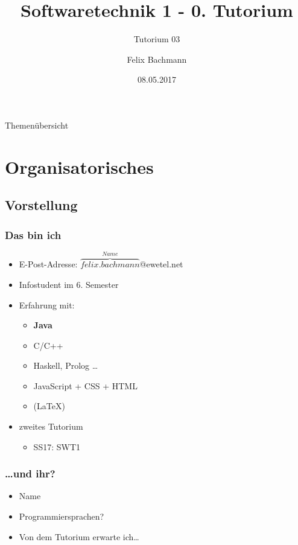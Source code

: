 \documentclass[18pt]{beamer}
\title[SWT1]{Softwaretechnik 1 - 0. Tutorium}
\subtitle{Tutorium 03}
\author{Felix Bachmann}
\date{08.05.2017}
\institute{KIT - Institut für Programmstrukturen und Datenorganisation (IPD)}
\begin{document}

\begin{frame}
\titlepage
\end{frame}

\begin{frame}{Themenübersicht}
\tableofcontents
\end{frame}

\section{Organisatorisches}
	\subsection{Vorstellung}
		\begin{frame}
			\frametitle{Das bin ich}
			\begin{itemize}
				\item E-Post-Adresse: $\overbrace{felix.bachmann}^{Name}$@ewetel.net 
				\item Infostudent im 6. Semester
				\item Erfahrung mit:
				\begin{itemize}
					\item \textbf{Java}
					\item C/C++
					\item Haskell, Prolog \dots
					\item JavaScript + CSS + HTML
					\item (\LaTeX)
				\end{itemize}
				\item zweites Tutorium
				\begin{itemize}
					\item SS17: SWT1
				\end{itemize}
			\end{itemize}
		\end{frame}
		\begin{frame}
			\frametitle{\dots und ihr?}
			\begin{itemize}
				\item Name
				\item Programmiersprachen?
				\item Von dem Tutorium erwarte ich\dots
			\end{itemize}
		\end{frame}
		
\end{document}
